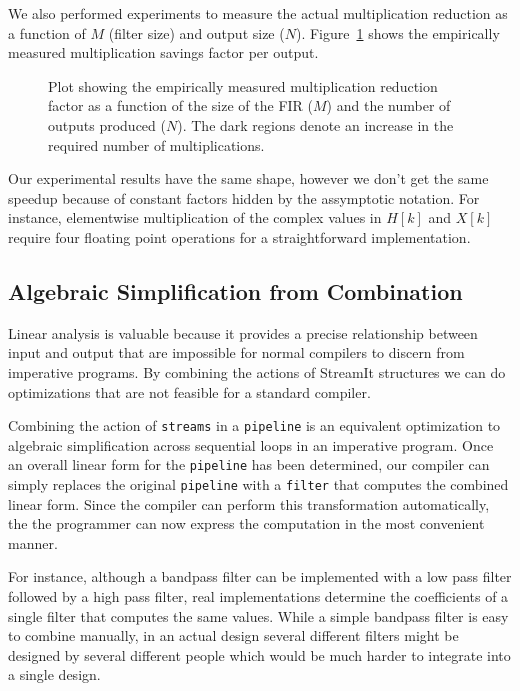 We also performed experiments to measure the actual multiplication reduction
as a function of $M$ (filter size) and output size ($N$).
Figure~\ref{fig:frequency-win-empirical} shows the empirically measured
multiplication savings factor per output.

\begin{figure}
\center
\epsfxsize=3.0in
\caption{Plot showing the empirically measured multiplication reduction factor as a function of the size of the FIR ($M$) and the number of outputs produced ($N$). The dark regions denote an increase in the required number of multiplications.}
\label{fig:frequency-win-empirical}
\vspace{-12pt}
\end{figure}


Our experimental results have the same shape, however we don't get the same
speedup because of constant factors hidden by the assymptotic notation. For instance,
elementwise multiplication of the complex values in $H[k]$ and $X[k]$ require
four floating point operations for a straightforward implementation.

\subsection{Algebraic Simplification from Combination}
Linear analysis is valuable because it provides a precise relationship between input and output   
that are impossible for normal compilers to discern from imperative programs. By 
combining the actions of StreamIt structures we can do optimizations that are 
not feasible for a standard compiler.

Combining the action of {\tt streams} in a {\tt pipeline} is an equivalent optimization 
to algebraic simplification across sequential loops in an imperative program.
Once an overall linear form for the {\tt pipeline} has been determined, our compiler 
can simply replaces the original {\tt pipeline} with a {\tt filter} that computes the 
combined linear form. Since the compiler can perform this transformation automatically,
the the programmer can now express the computation in the most convenient manner. 

For instance, although a bandpass filter can be implemented with a 
low pass filter followed by a high pass filter, real implementations determine the coefficients 
of a single filter that computes the same values. While a simple bandpass filter is easy to combine
manually, in an actual design several different filters might be designed by 
several different people which would be much harder to integrate into a single design.

